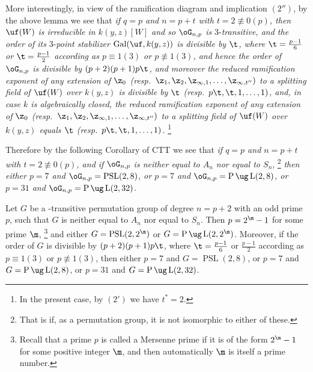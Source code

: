 More interestingly, in view of the ramification diagram 
and implication
$(2'')$, by the above lemma we see that {\it if $q=p$ and 
$n=p+t$
with $t=2\not\equiv 0(p)$, then
$\uf(W)$ is irreducible in $k(y,z)[W]$ and so $\oG_{n,p}$ 
is} 
3-{\it transitive, and the order of its} 3-{\it point 
stabilizer}
$\operatorname{Gal}(\uf,k(y,z))$ {\it is divisible by 
$\t$, where $\t=\frac{p-1}{6}$ 
or $\t=\frac{p-1}{2}$ according as $p\equiv 1(3)$ or 
$p\not\equiv 1(3)$, 
and hence the order of $\oG_{n,p}$ is divisible by $(p+
2)(p+1)p\t$, and
moreover the reduced ramification exponent of any 
extension of $\z_0$
\RM(resp.\ $\z_1,\z_2,\z_{\infty,1},\dots,\z_{\infty,t''})$
to a splitting field of $\uf(W)$ over $k(y,z)$ is 
divisible by $\t$
\RM(resp.\ $p\t,\t,1,\dots,1)$, and, in case $k$ is 
algebraically closed,
the reduced ramification exponent of any extension of $\z_0$
\RM(resp.\ $\z_1,\z_2,\z_{\infty,1},\dots,\z_{\infty,t''})$
to a splitting field of $\uf(W)$ over $k(y,z)$ equals $\t$
\RM(resp.\ $p\t,\t,1,\dots,1)$.}
\footnote{In the present case, by $(2')$ we have $t^*=2$.}

Therefore by the following Corollary of CTT we see that 
{\it if 
$q=p$ and $n=p+t$ with $t=2\not\equiv 0(p)$, and if 
$\oG_{n,p}$ is
neither equal to $A_n$ nor equal to $S_n$},
\footnote{That is if, as a permutation group, it is not 
isomorphic to either
of these.}
{\it then either $p=7$ and 
$\oG_{n,p}=\operatorname{PSL}(2,8)$, or $p=7$ and 
$\oG_{n,p}=\operatorname{P}\ug\operatorname{L}(2,8)$, or
$p=31$ and 
$\oG_{n,p}=\operatorname{P}\ug\operatorname{L}(2,32)$.} 

Let $G$ be a -transitive permutation group of degree 
$n=p+2$ with
an odd prime $p$, such that $G$ is neither equal to $A_n$ 
nor equal to
$S_n$. Then $p=2^\m-1$ for some prime $\m$,
\footnote{Recall that a prime $p$ is called a Mersenne 
prime if it is of
the form $2^{\m}-1$ for some positive integer $\m$, and 
then automatically 
$\m$ is itself a prime number.}
and either $G=\operatorname{PSL}(2,2^{\m})$ or 
$G=\operatorname{P}\ug\operatorname{L}(2,2^{\m})$. 
Moreover, if the order 
of $G$ is divisible by $(p+2)(p+1)p\t$, where 
$\t=\frac{p-1}{6}$
or $\frac{p-1}{2}$ according as $p\equiv 1(3)$ or 
$p\not\equiv 1(3)$, then
either $p=7$ and $G=\operatorname{PSL}(2,8)$, or $p=7$ and 
$G=\operatorname{P}\ug\operatorname{L}(2,8)$, or 
$p=31$ and $G=\operatorname{P}\ug\operatorname{L}(2,32)$. 

\endproclaim

